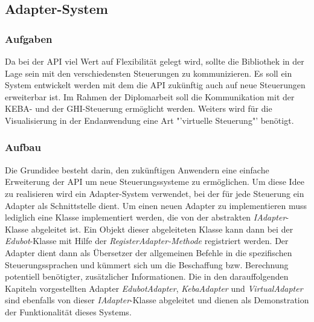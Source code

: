
\subsection{Adapter-System}

\subsubsection{Aufgaben}
Da bei der API viel Wert auf Flexibilität gelegt wird, sollte die Bibliothek in der Lage sein mit den verschiedensten Steuerungen zu kommunizieren. Es soll ein System entwickelt werden mit dem die API zukünftig auch auf neue Steuerungen erweiterbar ist. Im Rahmen der Diplomarbeit soll die Kommunikation mit der KEBA- und der GHI-Steuerung ermöglicht werden. Weiters wird für die Visualisierung in der Endanwendung eine Art "'virtuelle Steuerung"' benötigt.

\subsubsection{Aufbau}
Die Grundidee besteht darin, den zukünftigen Anwendern eine einfache Erweiterung der API um neue Steuerungssysteme zu ermöglichen. Um diese Idee zu realisieren wird ein Adapter-System verwendet, bei der für jede Steuerung ein Adapter als Schnittstelle dient. Um einen neuen Adapter zu implementieren muss lediglich eine Klasse implementiert werden, die von der abstrakten \textit{IAdapter}-Klasse abgeleitet ist. Ein Objekt dieser abgeleiteten Klasse kann dann bei der \textit{Edubot}-Klasse mit Hilfe der \textit{RegisterAdapter-Methode} registriert werden. Der Adapter dient dann als Übersetzer der allgemeinen Befehle in die spezifischen Steuerungssprachen und kümmert sich um die Beschaffung bzw. Berechnung potentiell benötigter, zusätzlicher Informationen. Die in den darauffolgenden Kapiteln vorgestellten Adapter  \textit{EdubotAdapter}, \textit{KebaAdapter} und \textit{VirtualAdapter} sind ebenfalls von dieser \textit{IAdapter}-Klasse abgeleitet und dienen als Demonstration der Funktionalität dieses Systems. 


